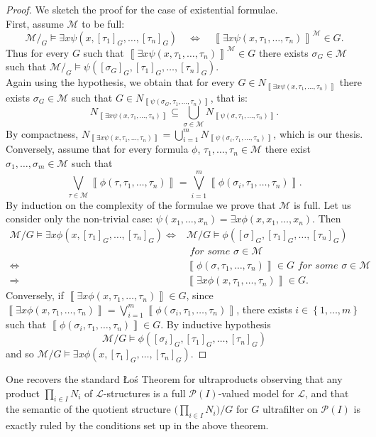 \documentclass[11pt]{amsart}
\newcommand{\LL}{\mathcal{L}}
\theoremstyle{plain}
\theoremstyle{definition}
\theoremstyle{plain}
\theoremstyle{remark}
\newcommand{\M}{\mathcal{M}}
\newcommand{\pow}[1]{\mathcal{P}\left(#1\right)}
\newcommand{\Qp}[1]{\left\llbracket #1 \right\rrbracket}
\newcommand{\bp}[1]{\left\lbrace #1 \right\rbrace}
\newcommand{\0}{\mathsf{0}}
\renewcommand{\1}{\mathsf{1}}
\renewcommand{\2}{\mathsf{2}}
\theoremstyle{definition}
\begin{document}
\begin{proof}
We sketch the proof for the case of existential formulae.\\
First, assume $\M$ to be full:
\[
\M/_G\models\exists x\psi(x, [\tau_1]_G,\dots,[\tau_n]_G)\quad\Leftrightarrow\quad\Qp{\exists x\psi(x, \tau_1,\dots,\tau_n)}^\M\in G.
\]
Thus for every $G$ such that $\Qp{\exists x\psi(x, \tau_1,\dots,\tau_n)}^\M\in G$ there exists $\sigma_G\in\M$ such that $\M/_G\models\psi([\sigma_G]_G, [\tau_1]_G,\dots,[\tau_n]_G).$ \\
Again using the hypothesis, we obtain that for every $G\in N_{\Qp{\exists x\psi(x, \tau_1,\dots,\tau_n)}}$ there exists $\sigma_G\in\M$ such that $G\in N_{\Qp{\psi(\sigma_G, \tau_1,\dots,\tau_n)}}$, that is:
\[
N_{\Qp{\exists x\psi(x, \tau_1,\dots,\tau_n)}}\subseteq\bigcup_{\sigma\in\M}N_{\Qp{\psi(\sigma, \tau_1,\dots,\tau_n)}}.
\]
By compactness, $N_{\Qp{\exists x\psi(x, \tau_1,\dots,\tau_n)}}=\bigcup_{i=1}^mN_{\Qp{\psi(\sigma_i, \tau_1, \dots, \tau_n)}}$, which is our thesis.\\
Conversely, assume that for every formula $\phi$, $\tau_1, \dots, \tau_n\in\M$ there exist $\sigma_1, \dots, \sigma_m\in\M$ such that
\[
\bigvee_{\tau\in \M}\Qp{\phi(\tau,\tau_1,\dots,\tau_n)}=\bigvee_{i=1}^m\Qp{\phi(\sigma_i,\tau_1,\dots,\tau_n)}.
\]
By induction on the complexity of the formulae we prove that $\M$ is full. Let us consider only the non-trivial case: $\psi(x_1,\dots, x_n)=\exists x\phi(x, x_1, \dots, x_n)$. Then
\begin{align*}
\M/G\models\exists x\phi(x, [\tau_1]_G, \dots, [\tau_n]_G)\Leftrightarrow&\M/G\models\phi([\sigma]_G, [\tau_1]_G, \dots, [\tau_n]_G)\\
&\textit{ for some }\sigma\in\M\\
\Leftrightarrow&\Qp{\phi(\sigma,\tau_1, \dots, \tau_n)}\in G\textit{ for some }\sigma\in\M\\
\Rightarrow&\Qp{\exists x\phi(x, \tau_1, \dots, \tau_n)}\in G.
\end{align*}
Conversely, if $\Qp{\exists x\phi(x, \tau_1, \dots, \tau_n)}\in G$, since $\Qp{\exists x\phi(x, \tau_1, \dots, \tau_n)}=\bigvee_{i=1}^m\Qp{\phi(\sigma_i, \tau_1, \dots, \tau_n)}$, there exists $i\in\bp{1, \dots, m}$ such that $\Qp{\phi(\sigma_i, \tau_1, \dots, \tau_n)}\in G$. By inductive hypothesis
\[
\M/G\models\phi([\sigma_i]_G, [\tau_1]_G, \dots, [\tau_n]_G)
\]
and so $\M/G\models\exists x\phi(x, [\tau_1]_G, \dots, [\tau_n]_G)$.
\end{proof}
One recovers the standard \L o\'s Theorem for ultraproducts observing that any product $\prod_{i\in I}N_i$ of $\LL$-structures
is a full $\pow{I}$-valued model for $\LL$, and that the semantic of the quotient structure $\bigl(\prod_{i\in I}N_i\bigr)/G$ for $G$ ultrafilter on $\pow{I}$
is exactly ruled by the conditions set up in the above theorem.\\
\end{document}
